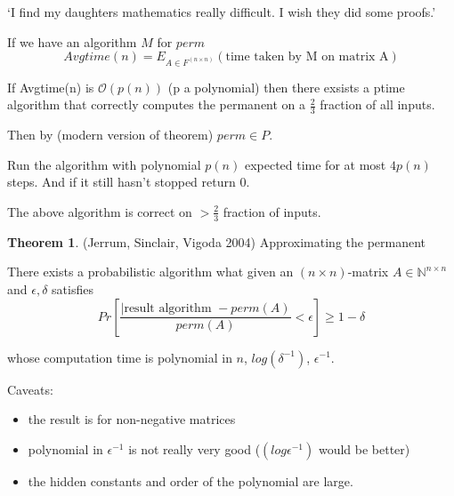 \documentclass[a4paper,12pt]{article}
\theoremstyle{definition}
\newtheorem{theorem}[counter]{Theorem}
\theoremstyle{remark}
\newcommand{\N}{\mathbb{N}}
\begin{document}
`I find my daughters mathematics really difficult. I wish they did some proofs.'

If we have an algorithm $M$ for $perm$
\begin{equation*}
    Avgtime(n) = E_{A \in F^{(n \times n)}} (\text{time taken by M on matrix A})
\end{equation*}

If Avgtime(n) is $\mathscr{O}(p(n))$ (p a polynomial) then there exsists a ptime 
algorithm that correctly computes the permanent on a $\frac{2}{3}$ fraction of all inputs. 

Then by (modern version of theorem) $perm \in P$.

Run the algorithm with polynomial $p(n)$ expected time for at most $4 p(n)$ steps. 
And if it still hasn't stopped return 0.

The above algorithm is correct on $> \frac{2}{3}$ fraction of inputs.

\begin{theorem}
    (Jerrum, Sinclair, Vigoda 2004) Approximating the permanent

    There exists a probabilistic algorithm what given an $(n \times n)$-matrix $A \in \N^{n \times n}$ 
    and $\epsilon, \delta$ satisfies 
    \begin{equation*}
        Pr [\frac{|\text{result algorithm } - perm(A)}{perm(A)} < \epsilon] \geq 1 - \delta
    \end{equation*}

    whose computation time is polynomial in $n$, $log(\delta^{-1})$, $\epsilon^{-1}$.

    Caveats:
    \begin{itemize}
        \item the result is for non-negative matrices
        \item polynomial in $\epsilon^{-1}$ is not really very good ($(log \epsilon^{-1})$ would be better)
        \item the hidden constants and order of the polynomial are large.
    \end{itemize}
\end{theorem}
\end{document}
